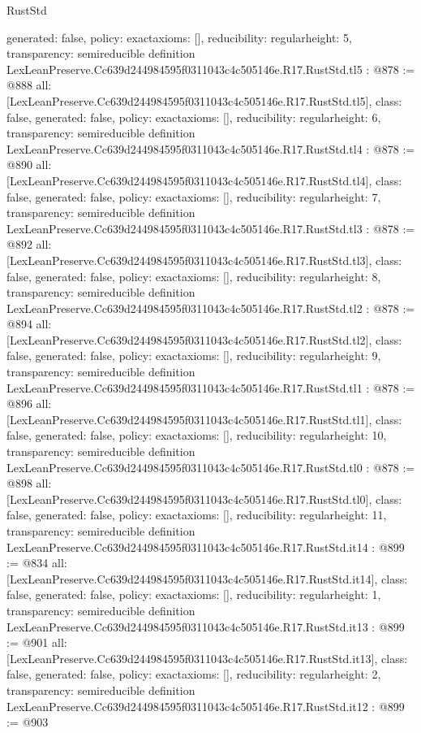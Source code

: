 \begin{lexlean}{RustStd}
\begin{coremodule}
{  generated: false,
  policy: exact{axioms: []},
  reducibility: regular{height: 5},
  transparency: semireducible
}
definition LexLeanPreserve.Cc639d244984595f0311043c4c505146e.R17.RustStd.tl5 : @878 := @888 {
  all: [LexLeanPreserve.Cc639d244984595f0311043c4c505146e.R17.RustStd.tl5],
  class: false,
  generated: false,
  policy: exact{axioms: []},
  reducibility: regular{height: 6},
  transparency: semireducible
}
definition LexLeanPreserve.Cc639d244984595f0311043c4c505146e.R17.RustStd.tl4 : @878 := @890 {
  all: [LexLeanPreserve.Cc639d244984595f0311043c4c505146e.R17.RustStd.tl4],
  class: false,
  generated: false,
  policy: exact{axioms: []},
  reducibility: regular{height: 7},
  transparency: semireducible
}
definition LexLeanPreserve.Cc639d244984595f0311043c4c505146e.R17.RustStd.tl3 : @878 := @892 {
  all: [LexLeanPreserve.Cc639d244984595f0311043c4c505146e.R17.RustStd.tl3],
  class: false,
  generated: false,
  policy: exact{axioms: []},
  reducibility: regular{height: 8},
  transparency: semireducible
}
definition LexLeanPreserve.Cc639d244984595f0311043c4c505146e.R17.RustStd.tl2 : @878 := @894 {
  all: [LexLeanPreserve.Cc639d244984595f0311043c4c505146e.R17.RustStd.tl2],
  class: false,
  generated: false,
  policy: exact{axioms: []},
  reducibility: regular{height: 9},
  transparency: semireducible
}
definition LexLeanPreserve.Cc639d244984595f0311043c4c505146e.R17.RustStd.tl1 : @878 := @896 {
  all: [LexLeanPreserve.Cc639d244984595f0311043c4c505146e.R17.RustStd.tl1],
  class: false,
  generated: false,
  policy: exact{axioms: []},
  reducibility: regular{height: 10},
  transparency: semireducible
}
definition LexLeanPreserve.Cc639d244984595f0311043c4c505146e.R17.RustStd.tl0 : @878 := @898 {
  all: [LexLeanPreserve.Cc639d244984595f0311043c4c505146e.R17.RustStd.tl0],
  class: false,
  generated: false,
  policy: exact{axioms: []},
  reducibility: regular{height: 11},
  transparency: semireducible
}
definition LexLeanPreserve.Cc639d244984595f0311043c4c505146e.R17.RustStd.it14 : @899 := @834 {
  all: [LexLeanPreserve.Cc639d244984595f0311043c4c505146e.R17.RustStd.it14],
  class: false,
  generated: false,
  policy: exact{axioms: []},
  reducibility: regular{height: 1},
  transparency: semireducible
}
definition LexLeanPreserve.Cc639d244984595f0311043c4c505146e.R17.RustStd.it13 : @899 := @901 {
  all: [LexLeanPreserve.Cc639d244984595f0311043c4c505146e.R17.RustStd.it13],
  class: false,
  generated: false,
  policy: exact{axioms: []},
  reducibility: regular{height: 2},
  transparency: semireducible
}
definition LexLeanPreserve.Cc639d244984595f0311043c4c505146e.R17.RustStd.it12 : @899 := @903 {
}
\end{coremodule}
\end{lexlean}
